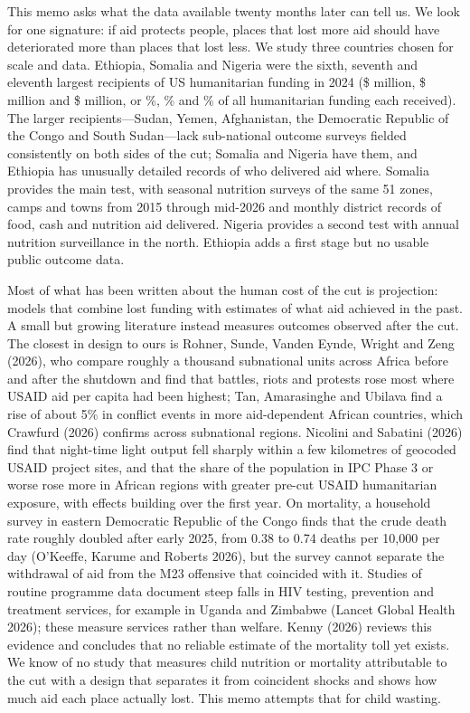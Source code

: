 \documentclass[11pt]{article}
\newcommand{\citeA}[1]{#1}
\newcommand{\citep}[1]{(#1)}
\begin{document}
This memo asks what the data available twenty months later can tell us. We look for one signature: if aid protects people, places that lost more aid should have deteriorated more than places that lost less. We study three countries chosen for scale and data. Ethiopia, Somalia and Nigeria were the sixth, seventh and eleventh largest recipients of US humanitarian funding in 2024 (\$\nscUsEth{} million, \$\nscUsSom{} million and \$\nscUsNga{} million, or \nscShareEth\%, \nscShareSom\% and \nscShareNga\% of all humanitarian funding each received). The larger recipients---Sudan, Yemen, Afghanistan, the Democratic Republic of the Congo and South Sudan---lack sub-national outcome surveys fielded consistently on both sides of the cut; Somalia and Nigeria have them, and Ethiopia has unusually detailed records of who delivered aid where. Somalia provides the main test, with seasonal nutrition surveys of the same 51 zones, camps and towns from 2015 through mid-2026 and monthly district records of food, cash and nutrition aid delivered. Nigeria provides a second test with annual nutrition surveillance in the north. Ethiopia adds a first stage but no usable public outcome data.

Most of what has been written about the human cost of the cut is projection: models that combine lost funding with estimates of what aid achieved in the past. A small but growing literature instead measures outcomes observed after the cut. The closest in design to ours is \citeA{Rohner, Sunde, Vanden Eynde, Wright and Zeng (2026)}, who compare roughly a thousand subnational units across Africa before and after the shutdown and find that battles, riots and protests rose most where USAID aid per capita had been highest; \citeA{Tan, Amarasinghe and Ubilava} find a rise of about 5\% in conflict events in more aid-dependent African countries, which \citeA{Crawfurd (2026)} confirms across subnational regions. \citeA{Nicolini and Sabatini (2026)} find that night-time light output fell sharply within a few kilometres of geocoded USAID project sites, and that the share of the population in IPC Phase 3 or worse rose more in African regions with greater pre-cut USAID humanitarian exposure, with effects building over the first year. On mortality, a household survey in eastern Democratic Republic of the Congo finds that the crude death rate roughly doubled after early 2025, from 0.38 to 0.74 deaths per 10,000 per day \citep{O'Keeffe, Karume and Roberts 2026}, but the survey cannot separate the withdrawal of aid from the M23 offensive that coincided with it. Studies of routine programme data document steep falls in HIV testing, prevention and treatment services, for example in Uganda and Zimbabwe \citep{Lancet Global Health 2026}; these measure services rather than welfare. \citeA{Kenny (2026)} reviews this evidence and concludes that no reliable estimate of the mortality toll yet exists. We know of no study that measures child nutrition or mortality attributable to the cut with a design that separates it from coincident shocks and shows how much aid each place actually lost. This memo attempts that for child wasting.
\end{document}
